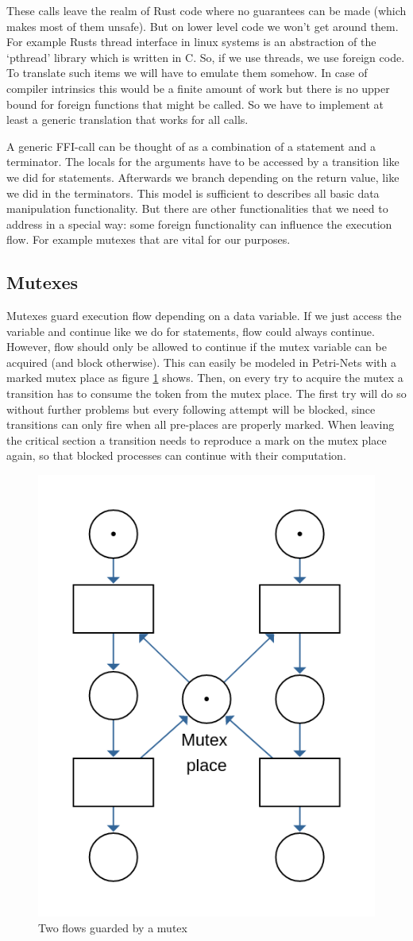 These calls leave the realm of Rust code where no guarantees can be made (which makes most of them unsafe).
But on lower level code we won't get around them.
For example Rusts thread interface in linux systems is an abstraction of the `pthread' library which is written in C.
So, if we use threads, we use foreign code.
To translate such items we will have to emulate them somehow.
In case of compiler intrinsics this would be a finite amount of work but there is no upper bound for foreign functions that might be called.
So we have to implement at least a generic translation that works for all calls.

A generic FFI-call can be thought of as a combination of a statement and a terminator.
The locals for the arguments have to be accessed by a transition like we did for statements.
Afterwards we branch depending on the return value, like we did in the terminators.
This model is sufficient to describes all basic data manipulation functionality.
But there are other functionalities that we need to address in a special way:
some foreign functionality can influence the execution flow.
For example mutexes that are vital for our purposes.

\subsection*{Mutexes}
Mutexes guard execution flow depending on a data variable.
If we just access the variable and continue like we do for statements, flow could always continue.
However, flow should only be allowed to continue if the mutex variable can be acquired (and block otherwise).
This can easily be modeled in Petri-Nets with a marked mutex place as figure \ref{mutex_net} shows.
Then, on every try to acquire the mutex a transition has to consume the token from the mutex place.
The first try will do so without further problems but every following attempt will be blocked, since transitions can only fire when all pre-places are properly marked.
When leaving the critical section a transition needs to reproduce a mark on the mutex place again, so that blocked processes can continue with their computation.
\begin{figure}
    \centering
    \includegraphics[width=.4\textwidth]{../diagrams/mutexNet.png}
    \caption{Two flows guarded by a mutex}
    \label{mutex_net}
\end{figure}

